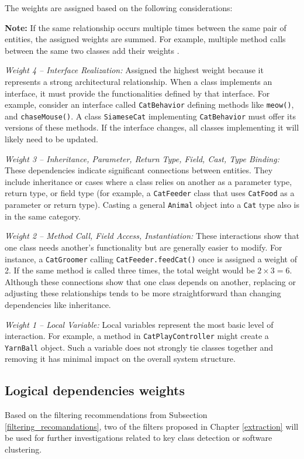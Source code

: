 The weights are assigned based on the following considerations:

\noindent \textbf{Note:} If the same relationship occurs multiple times between the same pair of entities, the assigned weights are summed. For example, multiple method calls between the same two classes add their weights \cite{cluster-access}.

\textit{Weight 4 – Interface Realization:}  
Assigned the highest weight because it represents a strong architectural relationship. When a class implements an interface, it must provide the functionalities defined by that interface. For example, consider an interface called \texttt{CatBehavior} defining methods like \texttt{meow()}, and \texttt{chaseMouse()}. A class \texttt{SiameseCat} implementing \texttt{CatBehavior} must offer its versions of these methods. If the interface changes, all classes implementing it will likely need to be updated.

\textit{Weight 3 – Inheritance, Parameter, Return Type, Field, Cast, Type Binding:}  
These dependencies indicate significant connections between entities. They include inheritance or cases where a class relies on another as a parameter type, return type, or field type (for example, a \texttt{CatFeeder} class that uses \texttt{CatFood} as a parameter or return type). Casting a general \texttt{Animal} object into a \texttt{Cat} type also is in the same category. 

\textit{Weight 2 – Method Call, Field Access, Instantiation:}  
These interactions show that one class needs another’s functionality but are generally easier to modify. For instance, a \texttt{CatGroomer} calling \texttt{CatFeeder.feedCat()} once is assigned a weight of 2. If the same method is called three times, the total weight would be \(2 \times 3 = 6\). Although these connections show that one class depends on another, replacing or adjusting these relationships tends to be more straightforward than changing dependencies like inheritance.

\textit{Weight 1 – Local Variable:}  
Local variables represent the most basic level of interaction. For example, a method in \texttt{CatPlayController} might create a \texttt{YarnBall} object. Such a variable does not strongly tie classes together and removing it has minimal impact on the overall system structure.




\subsection{Logical dependencies weights}
\label{subsec:logical_weights}
\hspace{4em}Based on the filtering recommendations from Subsection \ref{filtering_recomandations}, two of the filters proposed in Chapter \ref{extraction} will be used for further investigations related to key class detection or software clustering.

